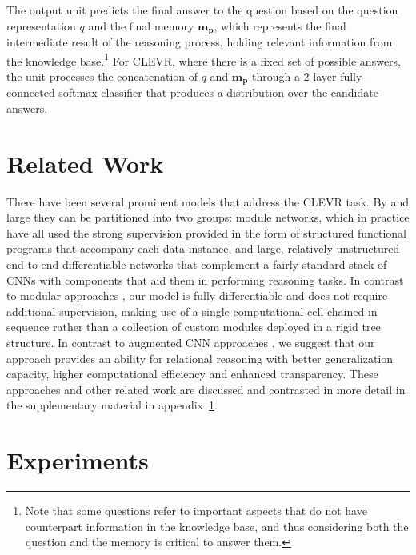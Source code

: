\documentclass[fleqn]{article}
\newcommand{\appref}[1]{appendix~\ref{sec:#1}}
\begin{document}
The output unit predicts the final answer to the question based on the question representation \(q\) and the final memory \(\boldsymbol{m_p}\), which represents the final intermediate result of the reasoning process, holding relevant information from the knowledge base.\footnote{Note that some questions refer to important aspects that do not have counterpart information in the knowledge base, and thus considering both the question and the memory is critical to answer them.} For CLEVR, where there is a fixed set of possible answers, the unit processes the concatenation of \(q\) and \(\boldsymbol{m_p}\) through a 2-layer fully-connected softmax classifier that produces a distribution over the candidate answers.





\section{Related Work}
\label{sec:related}

There have been several prominent models that address the CLEVR task. By and large they can be partitioned into two groups: module networks, which in practice have all used the strong supervision provided in the form of structured functional programs that accompany each data instance, and large, relatively unstructured end-to-end differentiable networks that complement a fairly standard stack of CNNs with components that aid them in performing reasoning tasks. In contrast to modular approaches \citep{nmn,nmn2,nmn3,pgee}, our model is fully differentiable and does not require additional supervision, making use of a single computational cell chained in sequence rather than a collection of custom modules deployed in a rigid tree structure. In contrast to augmented CNN approaches \citep{rn,film}, we suggest that our approach provides an ability for relational reasoning with better generalization capacity, higher computational efficiency and enhanced transparency. These approaches and other related work are discussed and contrasted in
more detail in the supplementary material in \appref{related}.

\section{Experiments}
\label{experiments}
\label{sec:experiments}
\end{document}

